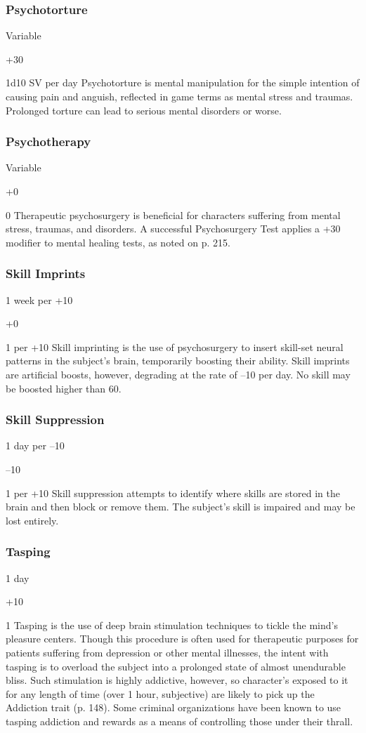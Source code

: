 \subsubsection{Psychotorture}


Variable

+30

1d10 SV per day
Psychotorture is mental manipulation for the simple 
intention of causing pain and anguish, reflected  in 
game terms as mental stress and traumas. Prolonged 
torture can lead to serious mental disorders or worse.

\subsubsection{Psychotherapy}


Variable

+0

0
Therapeutic psychosurgery is beneficial for characters 
suffering from mental stress, traumas, and disorders. A 
successful Psychosurgery Test applies a +30 modifier 
to mental healing tests, as noted on p. 215.

\subsubsection{Skill Imprints}


1 week per +10

+0

 1 per +10
Skill imprinting is the use of psychosurgery to insert 
skill-set neural patterns in the subject's brain, temporarily
boosting their ability. Skill imprints are artificial
boosts, however, degrading at the rate of –10 per day. 
No skill may be boosted higher than 60.

\subsubsection{Skill Suppression}


1 day per –10

–10

1 per +10
Skill suppression attempts to identify where skills are 
stored in the brain and then block or remove them. 
The subject's skill is impaired and may be lost entirely.

\subsubsection{Tasping}


1 day

+10

1
Tasping is the use of deep brain stimulation techniques 
to tickle the mind's pleasure centers. Though this 
procedure is often used for therapeutic purposes for 
patients suffering from depression or other mental 
illnesses, the intent with tasping is to overload the 
subject into a prolonged state of almost unendurable 
bliss. Such stimulation is highly addictive, however, so 
character's exposed to it for any length of time (over 
1 hour, subjective) are likely to pick up the Addiction 
trait (p. 148). Some criminal organizations have been 
known to use tasping addiction and rewards as a 
means of controlling those under their thrall.
